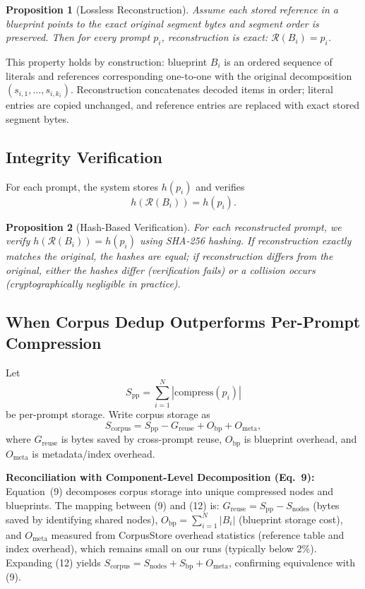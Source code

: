 \documentclass[10pt,conference]{IEEEtran}
\newtheorem{proposition}{Proposition}
\begin{document}
\begin{proposition}[Lossless Reconstruction]
Assume each stored reference in a blueprint points to the exact original segment bytes and segment order is preserved. Then for every prompt $p_i$, reconstruction is exact: $\mathcal{R}(B_i)=p_i$.
\end{proposition}

This property holds by construction: blueprint $B_i$ is an ordered sequence of literals and references corresponding one-to-one with the original decomposition $(s_{i,1},\dots,s_{i,k_i})$. Reconstruction concatenates decoded items in order; literal entries are copied unchanged, and reference entries are replaced with exact stored segment bytes.

\subsection{Integrity Verification}
For each prompt, the system stores $h(p_i)$ and verifies
\begin{equation}
h(\mathcal{R}(B_i))=h(p_i).
\end{equation}

\begin{proposition}[Hash-Based Verification]
For each reconstructed prompt, we verify $h(\mathcal{R}(B_i))=h(p_i)$ using SHA-256 hashing. If reconstruction exactly matches the original, the hashes are equal; if reconstruction differs from the original, either the hashes differ (verification fails) or a collision occurs (cryptographically negligible in practice).
\end{proposition}

\subsection{When Corpus Dedup Outperforms Per-Prompt Compression}
Let
\begin{equation}
S_{\text{pp}}=\sum_{i=1}^{N}|\text{compress}(p_i)|
\end{equation}
be per-prompt storage. Write corpus storage as
\begin{equation}
S_{\text{corpus}} = S_{\text{pp}} - G_{\text{reuse}} + O_{\text{bp}} + O_{\text{meta}},
\end{equation}
where $G_{\text{reuse}}$ is bytes saved by cross-prompt reuse, $O_{\text{bp}}$ is blueprint overhead, and $O_{\text{meta}}$ is metadata/index overhead.

\textbf{Reconciliation with Component-Level Decomposition (Eq.~9):} Equation~(9) decomposes corpus storage into unique compressed nodes and blueprints. The mapping between (9) and (12) is: $G_{\text{reuse}} = S_{\text{pp}} - S_{\text{nodes}}$ (bytes saved by identifying shared nodes), $O_{\text{bp}} = \sum_{i=1}^{N}|B_i|$ (blueprint storage cost), and $O_{\text{meta}}$ measured from CorpusStore overhead statistics (reference table and index overhead), which remains small on our runs (typically below 2\%). Expanding (12) yields $S_{\text{corpus}} = S_{\text{nodes}} + S_{\text{bp}} + O_{\text{meta}}$, confirming equivalence with (9).
\end{document}
